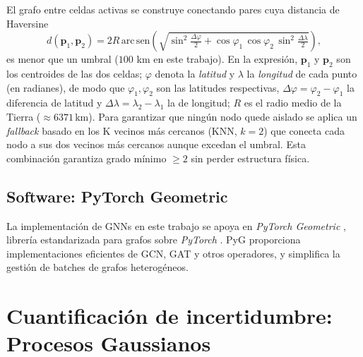 El grafo entre celdas activas se construye conectando pares cuya distancia de Haversine
\begin{equation}
  d(\mathbf{p}_1, \mathbf{p}_2) = 2 R\, \mathrm{arc\,sen}\!\left(\sqrt{\sin^2\!\tfrac{\Delta\varphi}{2} + \cos\varphi_1\,\cos\varphi_2\,\sin^2\!\tfrac{\Delta\lambda}{2}}\right),
  \label{eq:haversine}
\end{equation}
es menor que un umbral (\(100\) km en este trabajo). En la expresión, $\mathbf{p}_1$ y $\mathbf{p}_2$ son los centroides de las dos celdas; $\varphi$ denota la \emph{latitud} y $\lambda$ la \emph{longitud} de cada punto (en radianes), de modo que $\varphi_1,\varphi_2$ son las latitudes respectivas, $\Delta\varphi = \varphi_2 - \varphi_1$ la diferencia de latitud y $\Delta\lambda = \lambda_2 - \lambda_1$ la de longitud; $R$ es el radio medio de la Tierra ($\approx 6371$\,km). Para garantizar que ningún nodo quede aislado se aplica un \textit{fallback} basado en los K vecinos más cercanos (KNN, $k=2$) que conecta cada nodo a sus dos vecinos más cercanos aunque excedan el umbral. Esta combinación garantiza grado mínimo $\geq 2$ sin perder estructura física.

\subsection{Software: PyTorch Geometric}

La implementación de GNNs en este trabajo se apoya en \emph{PyTorch Geometric} \citep{fey2019pyg}, librería estandarizada para grafos sobre \emph{PyTorch} \citep{paszke2019pytorch}. PyG proporciona implementaciones eficientes de GCN, GAT y otros operadores, y simplifica la gestión de batches de grafos heterogéneos.

\section{Cuantificación de incertidumbre: Procesos Gaussianos}
\label{dl-incertidumbre}

